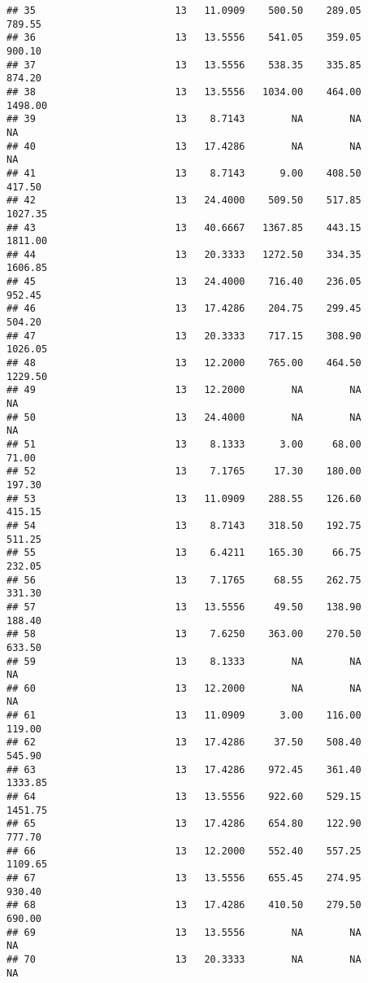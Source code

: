 \documentclass[]{article}
\begin{document}
\begin{verbatim}
## 35                        13   11.0909    500.50    289.05     789.55
## 36                        13   13.5556    541.05    359.05     900.10
## 37                        13   13.5556    538.35    335.85     874.20
## 38                        13   13.5556   1034.00    464.00    1498.00
## 39                        13    8.7143        NA        NA         NA
## 40                        13   17.4286        NA        NA         NA
## 41                        13    8.7143      9.00    408.50     417.50
## 42                        13   24.4000    509.50    517.85    1027.35
## 43                        13   40.6667   1367.85    443.15    1811.00
## 44                        13   20.3333   1272.50    334.35    1606.85
## 45                        13   24.4000    716.40    236.05     952.45
## 46                        13   17.4286    204.75    299.45     504.20
## 47                        13   20.3333    717.15    308.90    1026.05
## 48                        13   12.2000    765.00    464.50    1229.50
## 49                        13   12.2000        NA        NA         NA
## 50                        13   24.4000        NA        NA         NA
## 51                        13    8.1333      3.00     68.00      71.00
## 52                        13    7.1765     17.30    180.00     197.30
## 53                        13   11.0909    288.55    126.60     415.15
## 54                        13    8.7143    318.50    192.75     511.25
## 55                        13    6.4211    165.30     66.75     232.05
## 56                        13    7.1765     68.55    262.75     331.30
## 57                        13   13.5556     49.50    138.90     188.40
## 58                        13    7.6250    363.00    270.50     633.50
## 59                        13    8.1333        NA        NA         NA
## 60                        13   12.2000        NA        NA         NA
## 61                        13   11.0909      3.00    116.00     119.00
## 62                        13   17.4286     37.50    508.40     545.90
## 63                        13   17.4286    972.45    361.40    1333.85
## 64                        13   13.5556    922.60    529.15    1451.75
## 65                        13   17.4286    654.80    122.90     777.70
## 66                        13   12.2000    552.40    557.25    1109.65
## 67                        13   13.5556    655.45    274.95     930.40
## 68                        13   17.4286    410.50    279.50     690.00
## 69                        13   13.5556        NA        NA         NA
## 70                        13   20.3333        NA        NA         NA

\end{verbatim}
\end{document}
